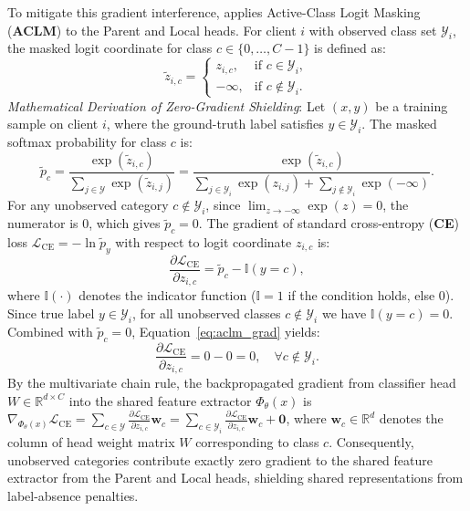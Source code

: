 To mitigate this gradient interference, \fedhep{} applies Active-Class Logit Masking (\textbf{ACLM}) to the Parent and Local heads. For client $i$ with observed class set $\mathcal{Y}_i$, the masked logit coordinate for class $c \in \{0, \dots, C-1\}$ is defined as:
\begin{equation}
\label{eq:aclm}
\tilde{z}_{i, c} = 
\begin{cases} 
z_{i, c}, & \text{if } c \in \mathcal{Y}_i, \\ 
-\infty, & \text{if } c \notin \mathcal{Y}_i.
\end{cases}
\end{equation}
\noindent\textit{Mathematical Derivation of Zero-Gradient Shielding}:
Let $(x, y)$ be a training sample on client $i$, where the ground-truth label satisfies $y \in \mathcal{Y}_i$. The masked softmax probability for class $c$ is:
\begin{equation}
\tilde{p}_c = \frac{\exp(\tilde{z}_{i, c})}{\sum_{j \in \mathcal{Y}} \exp(\tilde{z}_{i, j})} = \frac{\exp(\tilde{z}_{i, c})}{\sum_{j \in \mathcal{Y}_i} \exp(z_{i, j}) + \sum_{j \notin \mathcal{Y}_i} \exp(-\infty)}.
\end{equation}
For any unobserved category $c \notin \mathcal{Y}_i$, since $\lim_{z \to -\infty} \exp(z) = 0$, the numerator is $0$, which gives $\tilde{p}_c = 0$.
The gradient of standard cross-entropy (\textbf{CE}) loss $\mathcal{L}_{\mathrm{CE}} = -\ln \tilde{p}_y$ with respect to logit coordinate $z_{i, c}$ is:
\begin{equation}
\label{eq:aclm_grad}
\frac{\partial \mathcal{L}_{\mathrm{CE}}}{\partial z_{i, c}} = \tilde{p}_c - \mathbb{I}(y = c),
\end{equation}
where $\mathbb{I}(\cdot)$ denotes the indicator function ($\mathbb{I}=1$ if the condition holds, else $0$). Since true label $y \in \mathcal{Y}_i$, for all unobserved classes $c \notin \mathcal{Y}_i$ we have $\mathbb{I}(y = c) = 0$. Combined with $\tilde{p}_c = 0$, Equation~\eqref{eq:aclm_grad} yields:
\begin{equation}
\frac{\partial \mathcal{L}_{\mathrm{CE}}}{\partial z_{i, c}} = 0 - 0 = 0, \quad \forall c \notin \mathcal{Y}_i.
\end{equation}
By the multivariate chain rule, the backpropagated gradient from classifier head $W \in \mathbb{R}^{d \times C}$ into the shared feature extractor $\Phi_\theta(x)$ is $\nabla_{\Phi_\theta(x)} \mathcal{L}_{\mathrm{CE}} = \sum_{c \in \mathcal{Y}} \frac{\partial \mathcal{L}_{\mathrm{CE}}}{\partial z_{i, c}} \mathbf{w}_c = \sum_{c \in \mathcal{Y}_i} \frac{\partial \mathcal{L}_{\mathrm{CE}}}{\partial z_{i, c}} \mathbf{w}_c + \mathbf{0}$, where $\mathbf{w}_c \in \mathbb{R}^d$ denotes the column of head weight matrix $W$ corresponding to class $c$. Consequently, unobserved categories contribute exactly zero gradient to the shared feature extractor from the Parent and Local heads, shielding shared representations from label-absence penalties.

